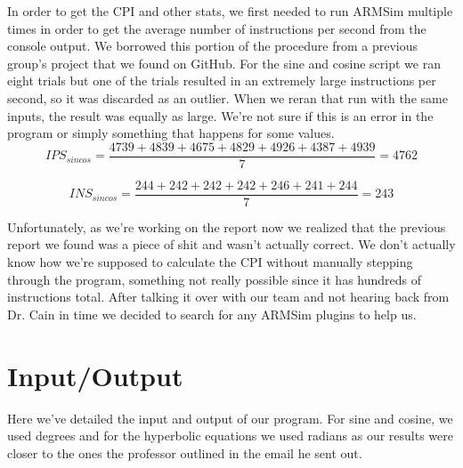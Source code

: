 \documentclass[11pt]{article}
\begin{document}
In order to get the CPI and other stats, we first needed to run ARMSim multiple times in order to get
the average number of instructions per second from the console output. We borrowed this portion of the
procedure from a previous group's project that we found on GitHub.\cite{oldreport} For the sine and
cosine script we ran eight trials but one of the trials resulted in an extremely large instructions
per second, so it was discarded as an outlier. When we reran that run with the same inputs, the result
was equally as large. We're not sure if this is an error in the program or simply something that happens
for some values.\\

\begin{equation}
    IPS_{sincos} = \frac{4739 + 4839 + 4675 + 4829 + 4926 + 4387 + 4939}{7} = 4762
\end{equation}

\begin{equation}
    INS_{sincos} = \frac{244 + 242 + 242 + 242 + 246 + 241 + 244}{7} = 243
\end{equation}

Unfortunately, as we're working on the report now we realized that the previous report we found was a
piece of shit and wasn't actually correct.\cite{oldreport} We don't actually know how we're supposed to
calculate the CPI without manually stepping through the program, something not really possible since it
has hundreds of instructions total. After talking it over with our team and not hearing back from Dr. Cain
in time we decided to search for any ARMSim plugins to help us.\\

\section{Input/Output}

Here we've detailed the input and output of our program. For sine and cosine, we used degrees and for the
hyperbolic equations we used radians as our results were closer to the ones the professor outlined in the
email he sent out.\cite{profemailresults}
\end{document}
